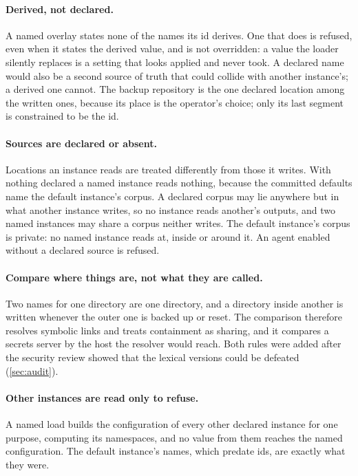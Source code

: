 \documentclass[11pt]{article}
\theoremstyle{plain}
\theoremstyle{definition}
\theoremstyle{remark}
\begin{document}
\paragraph{Derived, not declared.} A named overlay states none of the names its id derives. One
that does is refused, even when it states the derived value, and is not overridden: a value the
loader silently replaces is a setting that looks applied and never took. A declared name would also
be a second source of truth that could collide with another instance's; a derived one cannot. The
backup repository is the one declared location among the written ones, because its place is the
operator's choice; only its last segment is constrained to be the id.

\paragraph{Sources are declared or absent.} Locations an instance reads are treated differently
from those it writes. With nothing declared a named instance reads nothing, because the committed
defaults name the default instance's corpus. A declared corpus may lie anywhere but in what another
instance writes, so no instance reads another's outputs, and two named instances may share a corpus
neither writes. The default instance's corpus is private: no named instance reads at, inside or
around it. An agent enabled without a declared source is refused.

\paragraph{Compare where things are, not what they are called.} Two names for one directory are one
directory, and a directory inside another is written whenever the outer one is backed up or reset.
The comparison therefore resolves symbolic links and treats containment as sharing, and it compares
a secrets server by the host the resolver would reach. Both rules were added after the security
review showed that the lexical versions could be defeated (\cref{sec:audit}).

\paragraph{Other instances are read only to refuse.} A named load builds the configuration of
every other declared instance for one purpose, computing its namespaces, and no value from them
reaches the named configuration. The default instance's names, which predate ids, are exactly what
they were.
\end{document}
